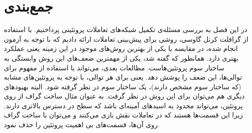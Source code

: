 \section{جمع‌بندی}
در این فصل به بررسی مسئله‌ی تکمیل شبکه‌های تعاملات پروتئینی پرداختیم. با استفاده از گرافلت کرنل گاوسی، روشی برای پیش‌بینی تعاملات ارائه دادیم که با توجه به آزمون انجام شده، در مقایسه با یکی از بهترین روش‌های موجود در این زمینه یعنی  عملکرد بهتری دارد. همانطور که گفته شد، یکی از مهمترین ضعف‌های این روش وابستگی به ساختار سوم پروتئین‌هاست. مطالعات بعدی، می‌تواند با استفاده از مفهوم  برای توالی‌ها، این ضعف را پوشش دهد. یعنی برای هر توالی، با توجه به پروتئین‌های مشابه (که ساختار سوم مشخص دارند)، یک ساختار سوم در نظر گرفته شود. البته بهبود‌های دیگری هم می‌توان برای این روش در نظر گرفت. به عنوان مثال ساخت گراف از روی پروتئین، می‌تواند محدود به اسید‌های آمینه‌ای باشد که سطح در دسترس بالاتری دارند. زیرا این قسمت‌ها هستند که در تعاملات نقش بازی می‌کنند و می‌توان با ساخت گراف روی آن‌ها، قسمت‌های بی اهمیت پروتئین را حذف نمود. 
